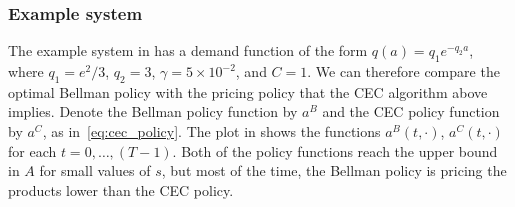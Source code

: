 \documentclass[main.tex]{subfiles}
\begin{document}
\subsubsection{Example system}\label{subsec:cec_comparison_example}
The example system in 
has a demand
function of the form $q(a)=q_1e^{-q_2a}$, where $q_1=e^2/3$,
$q_2=3$, $\gamma = 5\times 10^{-2}$, and $C=1$. We can therefore
compare the optimal Bellman policy with the
pricing policy that the CEC algorithm above implies.
Denote the Bellman policy function by $a^B$ and the CEC policy
function by $a^C$, as in~\eqref{eq:cec_policy}.
The plot in
 shows the functions
$a^B(t,\cdot)$, $a^C(t,\cdot)$ for each $t=0,\dots,(T-1)$.
Both of the policy functions reach the upper bound in $A$ for small values
of $s$, but most of the time, the Bellman policy is pricing the products
lower than the CEC policy.
\end{document}
